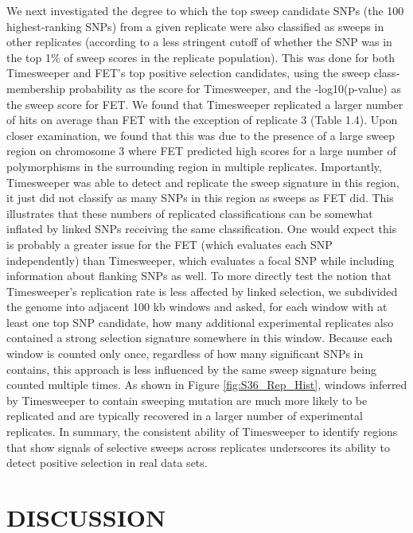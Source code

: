 We next investigated the degree to which the top sweep candidate SNPs (the 100 highest-ranking SNPs) from a given replicate were also classified as sweeps in other replicates (according to a less stringent cutoff of whether the SNP was in the top 1\% of sweep scores in the replicate population). This was done for both Timesweeper and FET’s top positive selection candidates, using the sweep class-membership probability as the score for Timesweeper, and the -log10(p-value) as the sweep score for FET. We found that Timesweeper replicated a larger number of hits on average than FET with the exception of replicate 3 (Table 1.4). Upon closer examination, we found that this was due to the presence of a large sweep region on chromosome 3 where FET predicted high scores for a large number of polymorphisms in the surrounding region in multiple replicates. Importantly, Timesweeper was able to detect and replicate the sweep signature in this region, it just did not classify as many SNPs in this region as sweeps as FET did. This illustrates that these numbers of replicated classifications can be somewhat inflated by linked SNPs receiving the same classification. One would expect this is probably a greater issue for the FET (which evaluates each SNP independently) than Timesweeper, which evaluates a focal SNP while including information about flanking SNPs as well. To more directly test the notion that Timesweeper’s replication rate is less affected by linked selection, we subdivided the genome into adjacent 100 kb windows and asked, for each window with at least one top SNP candidate, how many additional experimental replicates also contained a strong selection signature somewhere in this window. Because each window is counted only once, regardless of how many significant SNPs in contains, this approach is less influenced by the same sweep signature being counted multiple times. As shown in Figure \ref{fig:S36_Rep_Hist}, windows inferred by Timesweeper to contain sweeping mutation are much more likely to be replicated and are typically recovered in a larger number of experimental replicates. In summary, the consistent ability of Timesweeper to identify regions that show signals of selective sweeps across replicates underscores its ability to detect positive selection in real data sets. 



\section{DISCUSSION}


